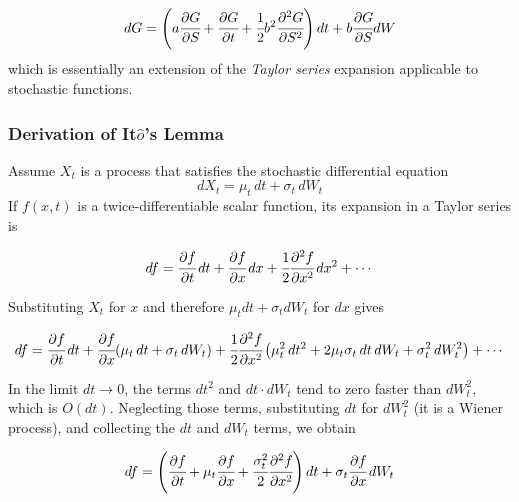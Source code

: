 \begin{equation}
dG = \left(a\cfrac{\partial G}{\partial S} + \cfrac{\partial G}{\partial t} + \cfrac{1}{2}b^2\cfrac{\partial^2 G}{\partial S^2} \right)dt + b \cfrac{\partial G}{\partial S}dW
\label{eq:itos_lemma}
\end{equation}
which is essentially an extension of the \emph{Taylor series} expansion applicable to stochastic functions.

\begin{attention}
\subsubsection{Derivation of It$\hat{o}$'s Lemma}
Assume $X_t$ is a process that satisfies the stochastic differential equation
\begin{equation*}	
dX_{t}=\mu_{t}\,dt+\sigma_{t}\,dW_{t}
\end{equation*}
If $f(x, t)$ is a twice-differentiable scalar function, its expansion in a Taylor series is
	
\begin{equation*}
df={\cfrac {\partial f}{\partial t}}\,dt+{\cfrac {\partial f}{\partial x}}\,dx+{\cfrac {1}{2}}{\cfrac {\partial ^{2}f}{\partial x^{2}}}\,dx^{2}+\cdots 
\end{equation*}

Substituting $X_t$ for $x$ and therefore $\mu_t dt + \sigma_t dW_t$ for $dx$ gives
	
\begin{equation*}
df={\cfrac {\partial f}{\partial t}}\,dt+{\cfrac {\partial f}{\partial x}}(\mu _{t}\,dt+\sigma _{t}\,dW_{t})+{\cfrac {1}{2}}{\cfrac {\partial ^{2}f}{\partial x^{2}}}\left(\mu _{t}^{2}\,dt^{2}+2\mu _{t}\sigma _{t}\,dt\,dW_{t}+\sigma _{t}^{2}\,dW_{t}^{2}\right)+\cdots 
\end{equation*}

In the limit $dt\rightarrow 0$, the terms $dt^2$ and $dt\cdot dW_t$ tend to zero faster than $dW_t^2$, which is $O(dt)$. Neglecting those terms, substituting $dt$ for $dW_t^2$ (it is a Wiener process), and collecting the $dt$ and $dW_t$ terms, we obtain
	
\begin{equation*}
df=\left({\cfrac {\partial f}{\partial t}}+\mu _{t}{\cfrac {\partial f}{\partial x}}+{\cfrac {\sigma _{t}^{2}}{2}}{\cfrac {\partial ^{2}f}{\partial x^{2}}}\right)dt+\sigma _{t}{\cfrac {\partial f}{\partial x}}\,dW_{t}
\end{equation*}
\end{attention}

